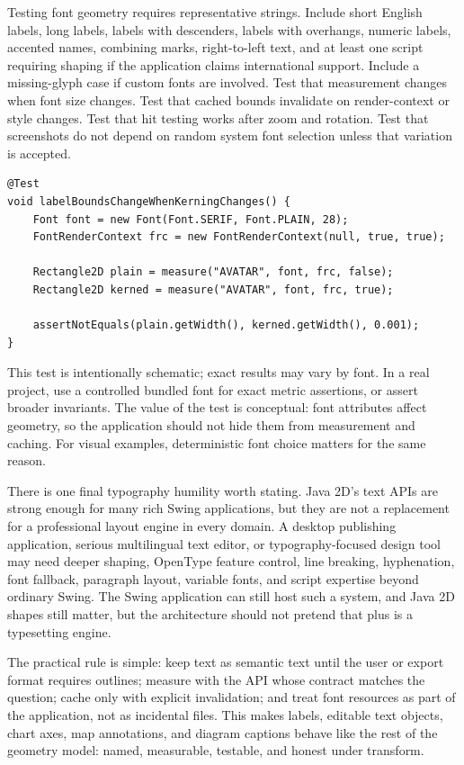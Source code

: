 Testing font geometry requires representative strings. Include short English labels, long labels, labels with descenders, labels with overhangs, numeric labels, accented names, combining marks, right-to-left text, and at least one script requiring shaping if the application claims international support. Include a missing-glyph case if custom fonts are involved. Test that measurement changes when font size changes. Test that cached bounds invalidate on render-context or style changes. Test that hit testing works after zoom and rotation. Test that screenshots do not depend on random system font selection unless that variation is accepted.

\begin{lstlisting}[caption={A small measurement regression test shape.}]
@Test
void labelBoundsChangeWhenKerningChanges() {
    Font font = new Font(Font.SERIF, Font.PLAIN, 28);
    FontRenderContext frc = new FontRenderContext(null, true, true);

    Rectangle2D plain = measure("AVATAR", font, frc, false);
    Rectangle2D kerned = measure("AVATAR", font, frc, true);

    assertNotEquals(plain.getWidth(), kerned.getWidth(), 0.001);
}
\end{lstlisting}

This test is intentionally schematic; exact results may vary by font. In a real project, use a controlled bundled font for exact metric assertions, or assert broader invariants. The value of the test is conceptual: font attributes affect geometry, so the application should not hide them from measurement and caching. For visual examples, deterministic font choice matters for the same reason.

There is one final typography humility worth stating. Java 2D's text APIs are strong enough for many rich Swing applications, but they are not a replacement for a professional layout engine in every domain. A desktop publishing application, serious multilingual text editor, or typography-focused design tool may need deeper shaping, OpenType feature control, line breaking, hyphenation, font fallback, paragraph layout, variable fonts, and script expertise beyond ordinary Swing. The Swing application can still host such a system, and Java 2D shapes still matter, but the architecture should not pretend that  plus  is a typesetting engine.

The practical rule is simple: keep text as semantic text until the user or export format requires outlines; measure with the API whose contract matches the question; cache only with explicit invalidation; and treat font resources as part of the application, not as incidental files. This makes labels, editable text objects, chart axes, map annotations, and diagram captions behave like the rest of the geometry model: named, measurable, testable, and honest under transform.


